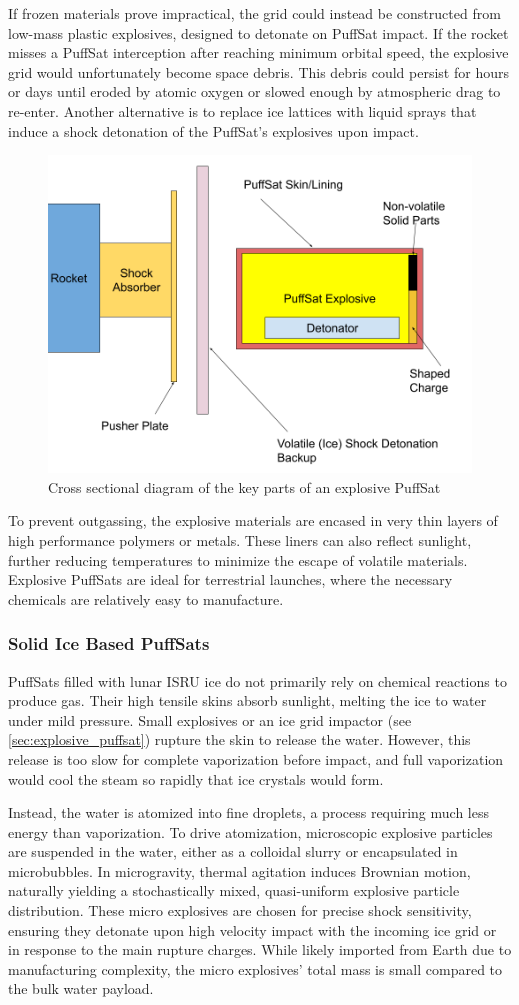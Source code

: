 \documentclass{article}
\begin{document}
If frozen materials prove impractical, the grid could instead be constructed from low-mass plastic explosives, designed to detonate on PuffSat impact.  If the rocket misses a PuffSat interception after reaching  minimum orbital speed, the explosive grid would unfortunately become space debris. This debris could  persist for hours or days until eroded by atomic oxygen or slowed enough by atmospheric drag to re-enter. Another alternative is to replace ice lattices with liquid sprays that induce a shock detonation of the PuffSat’s explosives upon impact.

\begin{figure}
    \centering
    \includegraphics[width=0.5\linewidth]{images/Explosive PuffSat.png}
    \caption{Cross sectional diagram of the key parts of an explosive PuffSat}
    \label{fig:explosive_puffsat}
\end{figure}

To prevent outgassing, the explosive materials are encased in very thin layers of high performance polymers or metals. These liners can also reflect sunlight, further reducing temperatures to minimize the escape of volatile materials. Explosive PuffSats are ideal for terrestrial launches, where the necessary chemicals are relatively easy to manufacture.

\subsubsection{Solid Ice Based PuffSats} \label{sec:icy_puffsat}
PuffSats filled with lunar ISRU ice do not primarily rely on chemical reactions to produce gas. Their high tensile skins absorb sunlight, melting the ice to water under mild pressure. Small explosives or an ice grid impactor (see \autoref{sec:explosive_puffsat}) rupture the skin to release the water. However, this release is too slow for complete vaporization before impact, and full vaporization would cool the steam so rapidly that ice crystals would form.

Instead, the water is atomized into fine droplets, a process requiring much less energy than vaporization. To drive atomization, microscopic explosive particles are suspended in the water, either as a colloidal slurry or encapsulated in microbubbles. In microgravity, thermal agitation induces Brownian motion, naturally yielding a stochastically mixed, quasi-uniform explosive particle distribution. These micro explosives are chosen for precise shock sensitivity, ensuring they detonate upon high velocity impact with the incoming ice grid or in response to the main rupture charges. While likely imported from Earth due to manufacturing complexity, the micro explosives' total mass is small compared to the bulk water payload.
\end{document}
